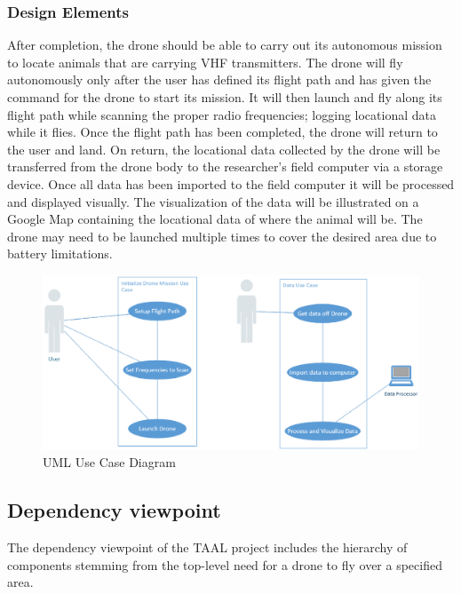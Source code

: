 \documentclass[onecolumn, draftclsnofoot,10pt, compsoc]{IEEEtran}
\begin{document}
\subsubsection{Design Elements}

After completion, the drone should be able to carry out its autonomous mission to locate animals that are carrying VHF transmitters.
The drone will fly autonomously only after the user has defined its flight path and has given the command for the drone to start its mission.
It will then launch and fly along its flight path while scanning the proper radio frequencies; logging locational data while it flies.
Once the flight path has been completed, the drone will return to the user and land.
On return, the locational data collected by the drone will be transferred from the drone body to the researcher's field computer via a storage device.
Once all data has been imported to the field computer it will be processed and displayed visually.
The visualization of the data will be illustrated on a Google Map containing the locational data of where the animal will be.
The drone may need to be launched multiple times to cover the desired area due to battery limitations.

\begin{figure}[h]

\includegraphics[width=7in]{useCase.eps}
\captionsetup{justification=centering}
\caption{UML Use Case Diagram}
\centering
\end{figure}

\subsection{Dependency viewpoint}

The dependency viewpoint of the TAAL project includes the hierarchy of components stemming from the top-level need for a drone to fly over a specified area.
\end{document}
